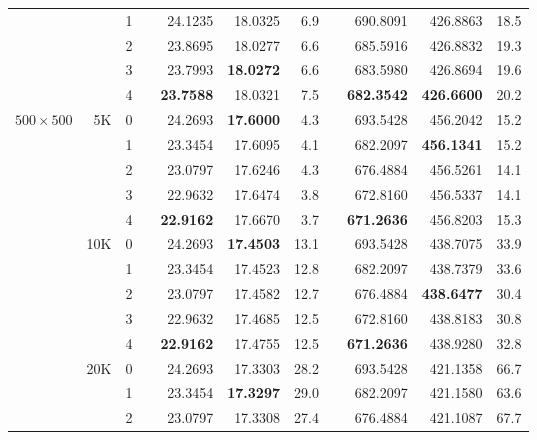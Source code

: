 \begin{table}[p!]
{\begin{tabular*}{\hsize}{crrlrrrlrrr}
                &     & 1 &   &      24.1235  &      18.0325  &  6.9 &  &      690.8091  &      426.8863  &  18.5 \\
                &     & 2 &   &      23.8695  &      18.0277  &  6.6 &  &      685.5916  &      426.8832  &  19.3 \\
                &     & 3 &   &      23.7993  & {\bf 18.0272} &  6.6 &  &      683.5980  &      426.8694  &  19.6 \\
                &     & 4 &   & {\bf 23.7588} &      18.0321  &  7.5 &  & {\bf 682.3542} & {\bf 426.6600} &  20.2 \\
\hline
$500\times 500$ &  5K & 0 &   &      24.2693  & {\bf 17.6000} &  4.3 &  &      693.5428  &      456.2042  &  15.2 \\
                &     & 1 &   &      23.3454  &      17.6095  &  4.1 &  &      682.2097  & {\bf 456.1341} &  15.2 \\
                &     & 2 &   &      23.0797  &      17.6246  &  4.3 &  &      676.4884  &      456.5261  &  14.1 \\
                &     & 3 &   &      22.9632  &      17.6474  &  3.8 &  &      672.8160  &      456.5337  &  14.1 \\
                &     & 4 &   & {\bf 22.9162} &      17.6670  &  3.7 &  & {\bf 671.2636} &      456.8203  &  15.3 \\
\cline{2-11}
                & 10K & 0 &   &      24.2693  & {\bf 17.4503} & 13.1 &  &      693.5428  &      438.7075  &  33.9 \\
                &     & 1 &   &      23.3454  &      17.4523  & 12.8 &  &      682.2097  &      438.7379  &  33.6 \\
                &     & 2 &   &      23.0797  &      17.4582  & 12.7 &  &      676.4884  & {\bf 438.6477} &  30.4 \\
                &     & 3 &   &      22.9632  &      17.4685  & 12.5 &  &      672.8160  &      438.8183  &  30.8 \\
                &     & 4 &   & {\bf 22.9162} &      17.4755  & 12.5 &  & {\bf 671.2636} &      438.9280  &  32.8 \\
\cline{2-11}
                & 20K & 0 &   &      24.2693  &      17.3303  & 28.2 &  &      693.5428  &      421.1358  &  66.7 \\
                &     & 1 &   &      23.3454  & {\bf 17.3297} & 29.0 &  &      682.2097  &      421.1580  &  63.6 \\
                &     & 2 &   &      23.0797  &      17.3308  & 27.4 &  &      676.4884  &      421.1087  &  67.7 \\

\end{tabular*}}
\end{table}
